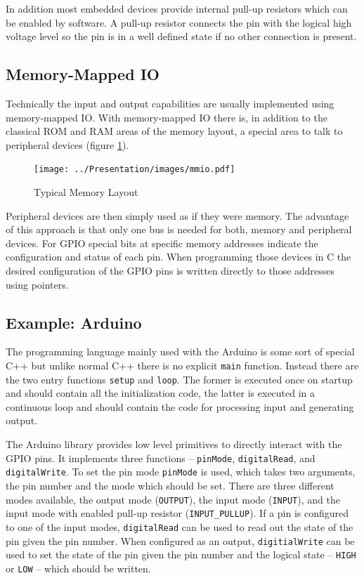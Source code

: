 \documentclass[pdftex,12pt,a4paper,fleqn]{scrartcl}
\begin{document}
In addition most embedded devices provide internal pull-up resistors which can be enabled by software. A pull-up resistor connects the pin with the logical high voltage level so the pin is in a well defined state if no other connection is present.

\subsection{Memory-Mapped IO}
Technically the input and output capabilities are usually implemented using memory-mapped IO. With memory-mapped IO there is, in addition to the classical ROM and RAM areas of the memory layout, a special area to talk to peripheral devices (figure \ref{fig:mmio_memory_layout}).

\begin{figure}[h]	
	\centering
    \texttt{[image: ../Presentation/images/mmio.pdf]}
    \caption{Typical Memory Layout}
    \label{fig:mmio_memory_layout}
\end{figure}

Peripheral devices are then simply used as if they were memory. The advantage of this approach is that only one bus is needed for both, memory and peripheral devices. For GPIO special bits at specific memory addresses indicate the configuration and status of each pin. When programming those devices in C the desired configuration of the GPIO pins is written directly to those addresses using pointers.

\subsection{Example: Arduino}
The programming language mainly used with the Arduino is some sort of special C++ but unlike normal C++ there is no explicit \texttt{main} function. Instead there are the two entry functions \texttt{setup} and \texttt{loop}. The former is executed once on startup and should contain all the initialization code, the latter is executed in a continuous loop and should contain the code for processing input and generating output.

The Arduino library provides low level primitives to directly interact with the GPIO pins. It implements three functions -- \texttt{pinMode}, \texttt{digitalRead}, and \texttt{digitalWrite}. To set the pin mode \texttt{pinMode} is used, which takes two arguments, the pin number and the mode which should be set. There are three different modes available, the output mode (\texttt{OUTPUT}), the input mode (\texttt{INPUT}), and the input mode with enabled pull-up resistor (\texttt{INPUT_PULLUP}). If a pin is configured to one of the input modes, \texttt{digitalRead} can be used to read out the state of the pin given the pin number. When configured as an output, \texttt{digitialWrite} can be used to set the state of the pin given the pin number and the logical state -- \texttt{HIGH} or \texttt{LOW} -- which should be written.
\end{document}
